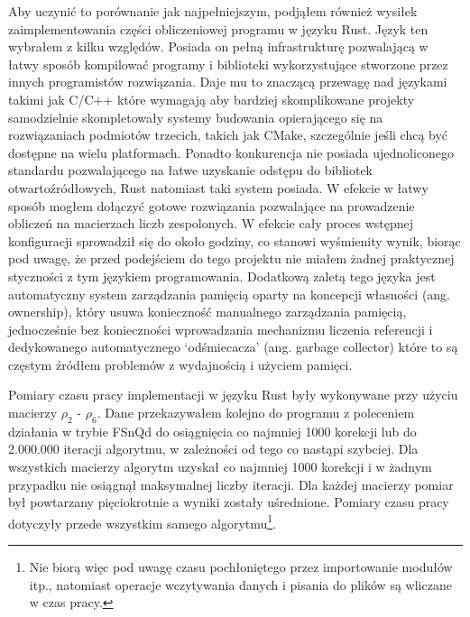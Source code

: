 \documentclass[11pt, a4paper]{article}
\begin{document}
\begin{sloppypar}
    Aby uczynić to porównanie jak najpełniejszym, podjąłem również wysiłek zaimplementowania
    części obliczeniowej programu w języku Rust. Język ten wybrałem z kilku względów. Posiada
    on pełną infrastrukturę pozwalającą w łatwy sposób kompilować programy i biblioteki wykorzystujące
    stworzone przez innych programistów rozwiązania. Daje mu to znaczącą przewagę nad
    językami takimi jak C/C++ które wymagają aby bardziej skomplikowane projekty
    samodzielnie skompletowały systemy budowania opierającego się na rozwiązaniach
    podmiotów trzecich, takich jak CMake, szczególnie jeśli chcą być dostępne na wielu
    platformach. Ponadto konkurencja nie posiada ujednoliconego standardu pozwalającego na
    łatwe uzyskanie odstępu do bibliotek otwartoźródłowych, Rust natomiast taki system
    posiada. W efekcie w łatwy sposób mogłem dołączyć gotowe rozwiązania pozwalające na prowadzenie
    obliczeń na macierzach liczb zespolonych. W efekcie cały proces wstępnej
    konfiguracji sprowadził się do około godziny, co stanowi wyśmienity wynik, biorąc
    pod uwagę, że przed podejściem do tego projektu nie miałem żadnej praktycznej styczności
    z tym językiem programowania. Dodatkową zaletą tego języka jest automatyczny system
    zarządzania pamięcią oparty na koncepcji własności (ang. ownership), który usuwa
    konieczność manualnego zarządzania pamięcią, jednocześnie bez konieczności wprowadzania
    mechanizmu liczenia referencji i dedykowanego automatycznego `odśmiecacza' (ang. garbage
    collector) które to są częstym źródłem problemów z wydajnością i użyciem pamięci.

    Pomiary czasu pracy implementacji w języku Rust były wykonywane przy użyciu macierzy
    $\rho_{2}$ - $\rho_{6}$. Dane przekazywałem kolejno do programu z poleceniem działania
    w trybie FSnQd do osiągnięcia co najmniej 1000 korekcji lub do 2.000.000 iteracji
    algorytmu, w zależności od tego co nastąpi szybciej. Dla wszystkich macierzy
    algorytm uzyskał co najmniej 1000 korekcji i w żadnym przypadku nie osiągnął
    maksymalnej liczby iteracji. Dla każdej macierzy pomiar był powtarzany pięciokrotnie
    a wyniki zostały uśrednione. Pomiary czasu pracy dotyczyły przede wszystkim samego
    algorytmu\footnote{Nie biorą więc pod uwagę czasu pochłoniętego przez importowanie modułów
    itp., natomiast operacje wczytywania danych i pisania do plików są wliczane w czas pracy.}.


\end{sloppypar}
\end{document}
